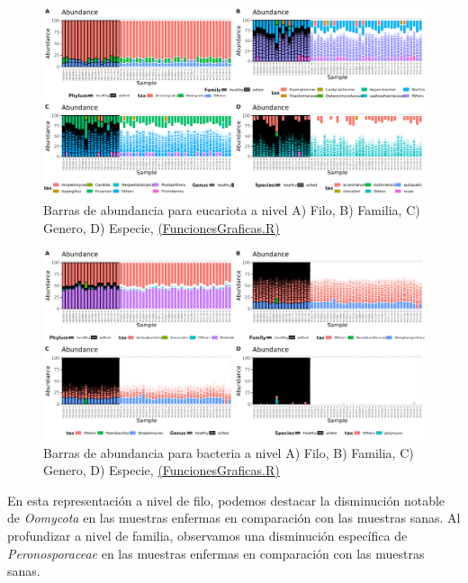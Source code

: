\begin{figure}[h]
\centering
\includegraphics[width=\textwidth]{Img/cap2/Barras_Eukarya10.png}
\caption{Barras de abundancia para eucariota a nivel A) Filo, B) Familia, C) Genero, D) Especie,  \href{https://github.com/CamilaSilva1995/Tesis_Maestria/blob/main/Analisis_Comparativo/Fresa_Solena/20230227_Funciones&Graficas.R}{(FuncionesGraficas.R)}}
\end{figure}

\begin{figure}[h]
\centering
\includegraphics[width=\textwidth]{Img/cap2/Barras_Bacteria10.png}
\caption{Barras de abundancia para bacteria a nivel A) Filo, B) Familia, C) Genero, D) Especie, \href{https://github.com/CamilaSilva1995/Tesis_Maestria/blob/main/Analisis_Comparativo/Fresa_Solena/20230227_Funciones&Graficas.R}{(FuncionesGraficas.R)}}
\end{figure}

En esta representación a nivel de filo, podemos destacar la disminución notable de \textit{Oomycota} en las muestras enfermas en comparación con las muestras sanas. Al profundizar a nivel de familia, observamos una disminución específica de \textit{Peronosporaceae} en las muestras enfermas en comparación con las muestras sanas.\\

